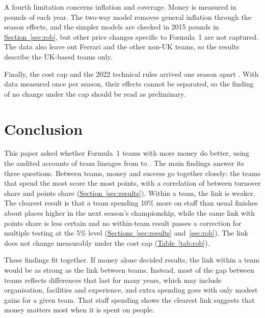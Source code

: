 \documentclass[11pt,a4paper]{article}
\begin{document}
A fourth limitation concerns inflation and coverage. Money is measured in pounds of each year. The two-way model removes
general inflation through the season effects, and the simpler models are checked in 2015 pounds in
\hyperref[sec:rob]{Section~\ref*{sec:rob}}, but other price changes specific to Formula~1 are not captured. The data also
leave out Ferrari and the other non-UK teams, so the results describe the UK-based teams only.

Finally, the cost cap and the 2022 technical rules arrived one season apart \citep{fia2021,fia2022tech}. With data measured
once per season, their effects cannot be separated, so the finding of no change under the cap should be read as
preliminary.

\section{Conclusion}
\label{sec:conclusion}

This paper asked whether Formula~1 teams with more money do better, using the audited accounts of \NTeams{} team lineages
from \FirstSeason{} to \LastSeason. The main findings answer its three questions. Between teams, money and success go
together closely: the teams that spend the most score the most points, with a correlation of \CorrAll{} between turnover
share and points share (\hyperref[sec:results]{Section~\ref*{sec:results}}). Within a team, the link is weaker. The
clearest result is that a team spending 10\% more on staff than usual finishes about \PosTenStaffcosts{} places higher in
the next season's championship, while the same link with points share is less certain and no within-team result passes a
correction for multiple testing at the 5\% level (\hyperref[sec:results]{Sections~\ref*{sec:results}}
and~\hyperref[sec:rob]{\ref*{sec:rob}}). The link does not change measurably under the cost cap
(\hyperref[tab:rob]{Table~\ref*{tab:rob}}).

These findings fit together. If money alone decided results, the link within a team would be as strong as the link between
teams. Instead, most of the gap between teams reflects differences that last for many years, which may include
organisation, facilities and experience, and extra spending goes with only modest gains for a given team. That staff
spending shows the clearest link suggests that money matters most when it is spent on people.
\end{document}
